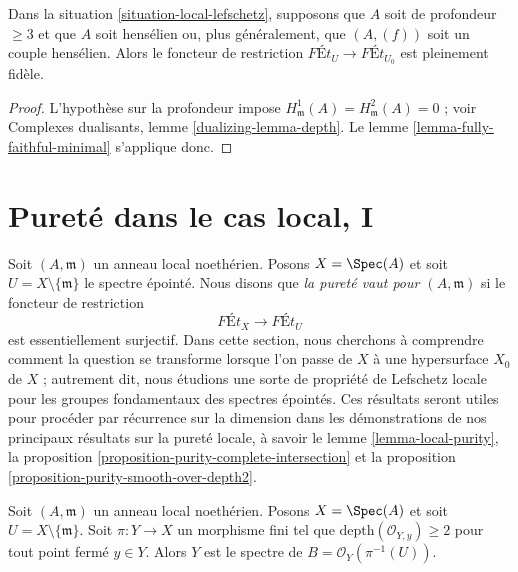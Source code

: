 \begin{lemma}
\label{lemma-fully-faithful}
Dans la situation \ref{situation-local-lefschetz}, supposons que $A$ soit de profondeur $\geq 3$
et que $A$ soit hensélien ou, plus généralement, que $(A, (f))$ soit un couple hensélien. Alors
le foncteur de restriction
$\textit{F\'Et}_U \to \textit{F\'Et}_{U_0}$
est pleinement fidèle.
\end{lemma}

\begin{proof}
L'hypothèse sur la profondeur impose
$H^1_\mathfrak m(A) = H^2_\mathfrak m(A) = 0$ ; voir
Complexes dualisants, lemme \ref{dualizing-lemma-depth}.
Le lemme \ref{lemma-fully-faithful-minimal} s'applique donc.
\end{proof}



























\section{Pureté dans le cas local, I}
\label{section-local-purity}

\noindent
Soit $(A, \mathfrak m)$ un anneau local noethérien. Posons $X = \Spec(A)$
et soit $U = X \setminus \{\mathfrak m\}$ le spectre épointé.
Nous disons que {\it la pureté vaut pour $(A, \mathfrak m)$} si le foncteur de restriction
$$
\textit{F\'Et}_X \longrightarrow \textit{F\'Et}_U
$$
est essentiellement surjectif. Dans cette section, nous cherchons à comprendre comment la
question se transforme lorsque l'on passe de $X$ à une hypersurface $X_0$ de $X$ ;
autrement dit, nous étudions une sorte de propriété de Lefschetz locale pour les
groupes fondamentaux des spectres épointés.
Ces résultats seront utiles pour procéder par récurrence sur la dimension
dans les démonstrations de nos principaux résultats sur la pureté locale, à savoir le
lemme \ref{lemma-local-purity},
la proposition \ref{proposition-purity-complete-intersection} et la
proposition \ref{proposition-purity-smooth-over-depth2}.

\begin{lemma}
\label{lemma-sections-over-punctured-spec}
Soit $(A, \mathfrak m)$ un anneau local noethérien. Posons $X = \Spec(A)$
et soit $U = X \setminus \{\mathfrak m\}$.
Soit $\pi : Y \to X$ un morphisme fini tel que
$\text{depth}(\mathcal{O}_{Y, y}) \geq 2$ pour tout point fermé
$y \in Y$.
Alors $Y$ est le spectre de $B = \mathcal{O}_Y(\pi^{-1}(U))$.
\end{lemma}


